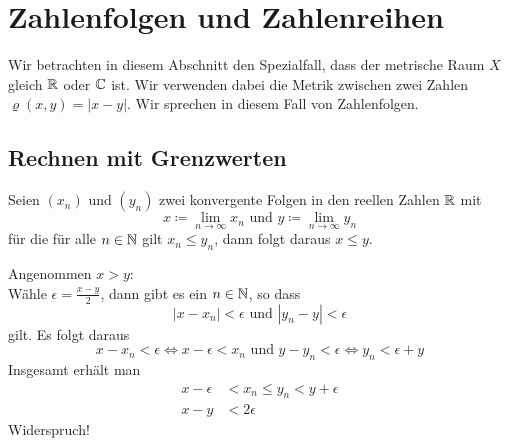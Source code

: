 \chapter{Zahlenfolgen und Zahlenreihen}
Wir betrachten in diesem Abschnitt den Spezialfall, dass der metrische Raum $X$ gleich $\mathbb{R}$ oder $\mathbb{C}$ ist. Wir verwenden dabei die Metrik zwischen zwei Zahlen $\varrho(x,y)=|x-y|$. Wir sprechen in diesem Fall von Zahlenfolgen.

\section{Rechnen mit Grenzwerten}
\begin{satz}{}
	Seien $(x_n)$ und $(y_n)$ zwei konvergente Folgen in den reellen Zahlen $\mathbb{R}$ mit
	\begin{equation*}
		x\coloneqq \lim\limits_{n\to\infty} x_n \text{ und } y\coloneqq \lim\limits_{n\to\infty} y_n
	\end{equation*}
	für die für alle $n\in\mathbb{N}$ gilt $x_n\leq y_n$, dann folgt daraus $x\leq y$.
\end{satz}
\beweis
Angenommen $x > y$:\\
Wähle $\epsilon =\frac{x-y}2$, dann gibt es ein $n\in\mathbb{N}$, so dass
\begin{equation*}
	|x-x_n|<\epsilon \text{ und } |y_n-y|<\epsilon
\end{equation*}
gilt. Es folgt daraus
\begin{equation*}
	x-x_n<\epsilon \Leftrightarrow x-\epsilon<x_n \text{ und } y-y_n<\epsilon \Leftrightarrow y_n<\epsilon + y
\end{equation*}
Insgesamt erhält man
\begin{align*}
	x-\epsilon &< x_n\leq y_n <y+\epsilon\\
	x-y&<2\epsilon
\end{align*}
Widerspruch!

